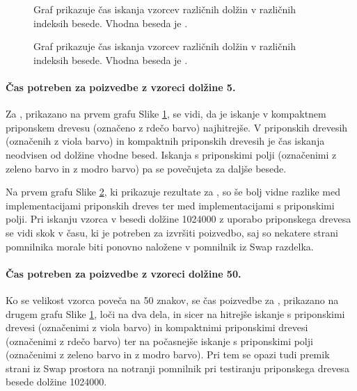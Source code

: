 \begin{figure}[htb]
    \centering
    
    \caption{Graf prikazuje čas iskanja vzorcev različnih dolžin v različnih indeksih besede. Vhodna beseda je \DNK.} 
    \label{fig:IskanjeGraf}
\end{figure}

\begin{figure}[htb]
    \centering
    
    \caption{Graf prikazuje čas iskanja vzorcev različnih dolžin v različnih indeksih besede. Vhodna beseda je \NK.} 
    \label{fig:IskanjeGrafSLO}
\end{figure}

\paragraph{Čas potreben za poizvedbe z vzoreci dolžine 5.}

Za \DNK, prikazano na prvem grafu Slike \ref{fig:IskanjeGraf}, se vidi, da je iskanje v kompaktnem priponskem drevesu (označeno z rdečo barvo) najhitrejše. V priponskih drevesih (označenih z viola barvo) in kompaktnih priponskih drevesih je čas iskanja neodvisen od dolžine vhodne besed. Iskanja s priponskimi polji (označenimi z zeleno barvo in z modro barvo) pa se povečujeta za daljše besede.

Na prvem grafu Slike \ref{fig:IskanjeGrafSLO}, ki prikazuje rezultate za \NK, so še bolj vidne razlike med implementacijami priponskih dreves ter med implementacijami s priponskimi polji. Pri iskanju vzorca v besedi dolžine 1024000 z uporabo priponskega drevesa se vidi skok v času, ki je potreben za izvršiti poizvedbo, saj so nekatere strani pomnilnika morale biti ponovno naložene v pomnilnik iz Swap razdelka.

\paragraph{Čas potreben za poizvedbe z vzoreci dolžine 50.}

Ko se velikost vzorca poveča na 50 znakov, se čas poizvedbe za \DNK, prikazano na drugem grafu Slike \ref{fig:IskanjeGraf}, loči na dva dela, in sicer na hitrejše iskanje s priponskimi drevesi (označenimi z viola barvo) in kompaktnimi priponskimi drevesi (označenimi z rdečo barvo) ter na počasnejše iskanje s priponskimi polji (označenimi z zeleno barvo in z modro barvo). Pri tem se opazi tudi premik strani iz Swap prostora na notranji pomnilnik pri testiranju priponskega drevesa besede dolžine 1024000.

